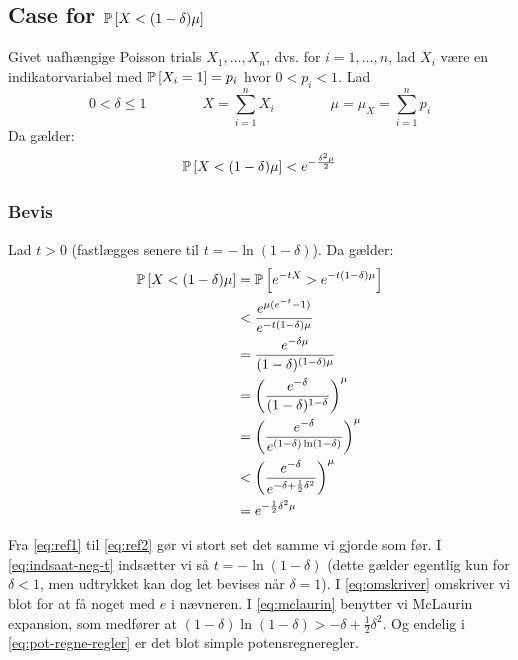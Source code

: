 \subsection{Case for $\P{X < (1 - \delta) \mu}$}
Givet uafhængige Poisson trials $X_1, \dots, X_n$, dvs. for $i = 1, \dots, n$, lad $X_i$ være en indikatorvariabel med $\P{X_i = 1} = p_i$ hvor $0 < p_i < 1$. Lad
$$
0 < \delta \leq 1
\quad\quad\quad\quad
X = \sum_{i=1}^n X_i
\quad\quad\quad\quad
\mu = \mu_X = \sum_{i=1}^n p_i
$$
Da gælder:
\begin{align}
  \P{X < (1 - \delta) \mu} < e^{- \frac{\delta^2 \mu}{2}} \label{eq:chernoff-2}
\end{align}


\subsubsection{Bevis}
Lad $t > 0$ (fastlægges senere til $t = - \ln(1 - \delta)$). Da gælder:
\begin{align}
  \P{X < (1 - \delta) \mu}
  &= \P{e^{- t X} > e^{-t (1 - \delta) \mu} } \label{eq:ref1} \\
  &< \frac{e^{\mu(e^{-t} - 1)}  }{e^{-t (1 - \delta) \mu}} \label{eq:ref2} \\
  &= \frac{e^{- \delta \mu}  }{ (1 - \delta)^{(1 - \delta) \mu} } \label{eq:indsaat-neg-t} \\
  &= \pfrac{e^{-\delta}}{(1 - \delta)^{1 - \delta}}^\mu \nonumber \\
  &= \pfrac{e^{-\delta}}{e^{(1 - \delta) \ln (1 - \delta)}}^\mu \label{eq:omskriver} \\
  &< \pfrac{e^{- \delta}}{e^{- \delta + \frac{1}{2} \delta^2}}^\mu \label{eq:mclaurin} \\
  &= e^{- \frac{1}{2} \delta^2 \mu} \label{eq:pot-regne-regler}
\end{align}

Fra \cref{eq:ref1} til \cref{eq:ref2} gør vi stort set det samme vi gjorde som før. I \cref{eq:indsaat-neg-t} indsætter vi så $t = - \ln(1 - \delta)$ (dette gælder egentlig kun for $\delta < 1$, men udtrykket kan dog let bevises når $\delta = 1$). I \cref{eq:omskriver} omskriver vi blot for at få noget med $e$ i nævneren. I \cref{eq:mclaurin} benytter vi McLaurin expansion, som medfører at $(1 - \delta) \ln(1 - \delta) > - \delta + \frac{1}{2} \delta^2$. Og endelig i \cref{eq:pot-regne-regler} er det blot simple potensregneregler.

